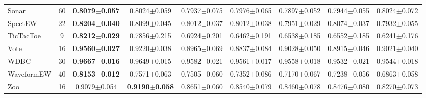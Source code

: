 \begin{table}[t]
\begin{tabular}{lcccccccc}
Sonar & 60 & \textbf{0.8079$\pm$0.057} & 0.8024$\pm$0.059 & 0.7937$\pm$0.075 & 0.7976$\pm$0.065 & 0.7897$\pm$0.052 & 0.7944$\pm$0.055 & 0.8024$\pm$0.072 \\
SpectEW & 22 & \textbf{0.8204$\pm$0.040} & 0.8099$\pm$0.045 & 0.8012$\pm$0.037 & 0.8012$\pm$0.038 & 0.7951$\pm$0.029 & 0.8074$\pm$0.037 & 0.7932$\pm$0.055 \\
TicTacToe & 9 & \textbf{0.8212$\pm$0.029} & 0.7856$\pm$0.215 & 0.6924$\pm$0.201 & 0.6462$\pm$0.191 & 0.6538$\pm$0.185 & 0.6552$\pm$0.185 & 0.6241$\pm$0.176 \\
Vote & 16 & \textbf{0.9560$\pm$0.027} & 0.9220$\pm$0.038 & 0.8965$\pm$0.069 & 0.8837$\pm$0.084 & 0.9028$\pm$0.050 & 0.8915$\pm$0.046 & 0.9021$\pm$0.040 \\
WDBC & 30 & \textbf{0.9667$\pm$0.016} & 0.9649$\pm$0.015 & 0.9582$\pm$0.021 & 0.9561$\pm$0.017 & 0.9558$\pm$0.018 & 0.9532$\pm$0.021 & 0.9544$\pm$0.018 \\
WaveformEW & 40 & \textbf{0.8153$\pm$0.012} & 0.7571$\pm$0.063 & 0.7505$\pm$0.060 & 0.7352$\pm$0.086 & 0.7170$\pm$0.067 & 0.7238$\pm$0.056 & 0.6863$\pm$0.058 \\
Zoo & 16 & 0.9079$\pm$0.054 & \textbf{0.9190$\pm$0.058} & 0.8651$\pm$0.060 & 0.8540$\pm$0.079 & 0.8460$\pm$0.078 & 0.8476$\pm$0.080 & 0.8270$\pm$0.073 \\
\bottomrule
\end{tabular}
\end{table}
